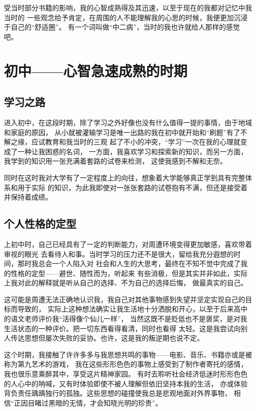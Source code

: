 \documentclass[AutoFakeBold]{LZUThesis}
\begin{document}
受当时部分书籍的影响，我的心智成熟得及其迅速，以至于现在的我都对记忆中我当时的
一些观念给予肯定，在周围的人不能理解我的心思的时候，我便更加沉浸于自己的“舒适圈”。
有一个词叫做“中二病”，当时的我也许就给人那样的感觉吧。

\section{初中——心智急速成熟的时期}

\subsection{学习之路}
进入初中，在这段时期，除了学习之外好像也没有什么值得一提的事情，由于地域和家庭的原因，
从小就被灌输学习是唯一出路的我在初中就开始和“刷题”有了不解之缘，应试教育和我当时的三观
起了不小的冲突，“学习”一次在我的心理就变成了一种让我困惑的名词，
一方面，我喜欢学习和探索新的知识，而另一方面，我学到的知识用一张充满着套路的试卷来检测，
这使我感到不解和无奈。

同时在这时我对大学有了一定程度上的向往，想象着大学能够真正学到具有完整体系和用于实际
的知识，为此我即使对一张张套路的试卷抱有不满，但还是接受着并保持着成绩。

\subsection{个人性格的定型}
上初中时，自己已经具有了一定的判断能力，对周遭环境变得更加敏感，喜欢带着审视的眼光
去看待人和事。当时学习的压力还不是很大，留给我充分遐想的时间，那时我总会一个人陷入对
社会和人生的大思考，最终在不知不觉中完成了我的性格的定型——避世、随性而为，听起来
有些消极，但是其实并非如此，实际上我对此的解释就是听从自己的选择、不为自己的选择后悔，
做最真实的自己。

这可能是周遭无法正确地认识我，我自己对其他事物感到失望并坚定实现自己的目标而导致的，
实际上这种想法确实让我生活地十分洒脱和开心，以至于后来高中的语文老师评价我“活得像个仙儿一样”，
当然这既不是贬低也不是褒奖，是对我生活状态的一种评价。把一切东西看得看清，同时也看得
太轻。这是我尝试向别人传达思想但屡次失败的妥协。也许，这是我的叛逆期也说不定。

这个时期，我接触了许许多多与我思想共鸣的事物——电影、音乐、书籍亦或是被称为第九艺术的游戏，
我在这些形形色色的事物上感受到了制作者寄托的感情，我也很乐意乘醉其中，享受这片精神家园。
有时去聆听社会经济低迷时形形色色的人心中的呐喊，又有时体验即使不被人理解但依旧坚持本我的生活，
亦或体验背负责任踽踽独行的孤独。这些思想的碰撞使我总是悲观地面对外界事物，
相信“正因目睹过黑暗的无情，才会知晓光明的珍贵”。
\end{document}
